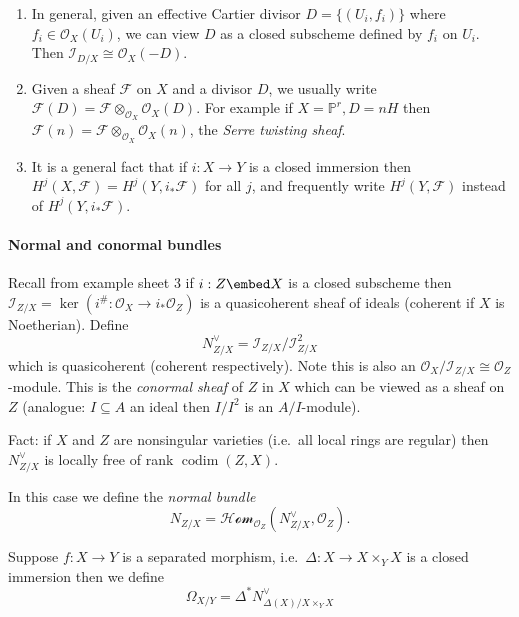 \documentclass[a4paper]{article}
\renewcommand*{\P}{\mathbb{P}}
\newcommand{\sh}[1]{\mathcal{#1}} %
\DeclareMathOperator{\codim}{codim} %
\begin{document}
\begin{remark}\leavevmode
  \begin{enumerate}
  \item In general, given an effective Cartier divisor \(D = \{(U_i, f_i)\}\) where \(f_i \in \sh O_X(U_i)\), we can view \(D\) as a closed subscheme defined by \(f_i\) on \(U_i\). Then \(\sh I_{D/X} \cong \sh O_X(-D)\).
  \item Given a sheaf \(\sh F\) on \(X\) and a divisor \(D\), we usually write \(\sh F(D) = \sh F \otimes_{\sh O_X} \sh O_X(D)\). For example if \(X = \P^r, D = nH\) then \(\sh F(n) = \sh F \otimes_{\sh O_X} \sh O_X(n)\), the \emph{Serre twisting sheaf}.
  \item It is a general fact that if \(i: X \to Y\) is a closed immersion then \(H^j(X, \sh F) = H^j(Y, i_* \sh F)\) for all \(j\), and frequently write \(H^j(Y, \sh F)\) instead of \(H^j(Y, i_* \sh F)\).
  \end{enumerate}
\end{remark}

\paragraph{Normal and conormal bundles}

Recall from example sheet 3 if \(i: Z \embed X\) is a closed subscheme then \(\sh I_{Z/X} = \ker(i^\#: \sh O_X \to i_* \sh O_Z)\) is a quasicoherent sheaf of ideals (coherent if \(X\) is Noetherian). Define
\[
  N_{Z/X}^\vee = \sh I_{Z/X}/\sh I_{Z/X}^2
\]
which is quasicoherent (coherent respectively). Note this is also an \(\sh O_X/\sh I_{Z/X} \cong \sh O_Z\)-module. This is the \emph{conormal sheaf} of \(Z\) in \(X\) which can be viewed as a sheaf on \(Z\) (analogue: \(I \subseteq A\) an ideal then \(I/I^2\) is an \(A/I\)-module).

Fact: if \(X\) and \(Z\) are nonsingular varieties (i.e.\ all local rings are regular) then \(N_{Z/X}^\vee\) is locally free of rank \(\codim(Z, X)\).

In this case we define the \emph{normal bundle}
\[
  N_{Z/X} = \sh{Hom}_{\sh O_Z}(N_{Z/X}^\vee, \sh O_Z).
\]

\begin{definition}[differential]
  Suppose \(f: X \to Y\) is a separated morphism, i.e.\ \(\Delta: X \to X \times_Y X\) is a closed immersion then we define
  \[
    \Omega_{X/Y} = \Delta^* N_{\Delta(X)/X \times_Y X}^\vee
  \]
\end{definition}
\end{document}
